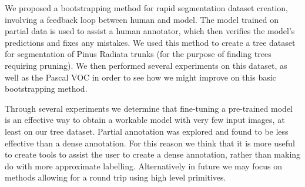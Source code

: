 \documentclass{IEEEtran}
\begin{document}
We proposed a bootstrapping method for rapid segmentation dataset creation, involving a feedback loop between human and model. The model trained on partial data is used to assist a human annotator, which then verifies the model's predictions and fixes any mistakes. We used this method to create a tree dataset for segmentation of Pinus Radiata trunks (for the purpose of finding trees requiring pruning). We then performed several experiments on this dataset, as well as the Pascal VOC in order to see how we might improve on this basic bootstrapping method. 

Through several experiments we determine that fine-tuning a pre-trained model is an effective way to obtain a workable model with very few input images, at least on our tree dataset. Partial annotation was explored and found to be less effective than a dense annotation. For this reason we think that it is more useful to create tools to assist the user to create a dense annotation, rather than making do with more approximate labelling. Alternatively in future we may focus on methods allowing for a round trip using high level primitives.



\end{document}
